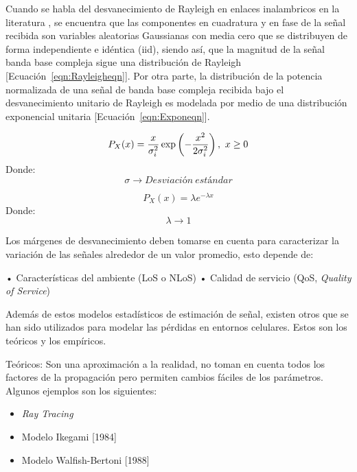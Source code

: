 Cuando se habla del desvanecimiento de Rayleigh en enlaces inalambricos en la literatura \parencite{RayleighScienceDirect}, se encuentra que las componentes en cuadratura y en fase de la señal recibida son variables aleatorias Gaussianas con media cero que se distribuyen de forma independiente e idéntica (iid), siendo así, que la magnitud de la señal banda base compleja sigue una distribución de Rayleigh [Ecuación~\ref{eqn:Rayleigheqn}]. Por otra parte, la distribución de la potencia normalizada de una señal de banda base compleja recibida bajo el desvanecimiento unitario de Rayleigh es modelada por medio de una distribución exponencial unitaria [Ecuación~\ref{eqn:Exponeqn}]. \label{DesvRayleigC2} \newline 

\begin{equation}
    P_{X}(x) = {x\over\sigma_{i}^{2}}\exp\left(-{x^{2}\over 2\sigma_{i}^{2}}\right),\ x\geq 0
    \label{eqn:Rayleigheqn}
\end{equation}
Donde:
\[\sigma\to Desviación\ estándar\] 

\begin{equation}
    P_{X}(x)=\lambda e^{-\lambda x}
    \label{eqn:Exponeqn}
\end{equation}
Donde:
\[\lambda\to 1\] 

Los márgenes de desvanecimiento deben tomarse en cuenta para caracterizar la variación de las señales alrededor de un valor promedio, esto depende de:\newline

•	Características del ambiente (LoS o NLoS)\newline
•	Calidad de servicio (QoS, \textit{Quality of Service})\newline

Además de estos modelos estadísticos de estimación de señal, existen otros que se han sido utilizados para modelar las pérdidas en entornos celulares. Estos son los teóricos y los empíricos. \newline

Teóricos: Son una aproximación a la realidad, no toman en cuenta todos los factores de la propagación pero permiten cambios fáciles de los parámetros. Algunos ejemplos son los siguientes:
\begin{itemize}
    \item \textit{Ray Tracing}
    \item Modelo Ikegami [1984]
    \item Modelo Walfish-Bertoni [1988]
\end{itemize}

